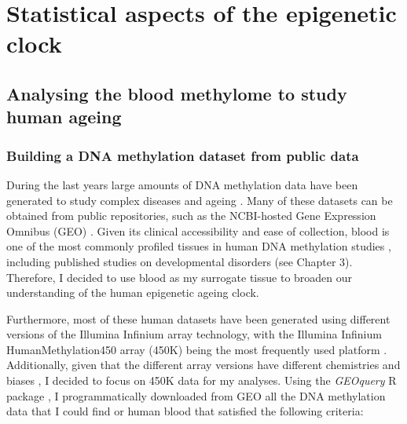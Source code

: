
\chapter{Statistical aspects of the epigenetic clock}  

\ifpdf
\graphicspath{{Chapter2/Figs/pdf/}}
\else
\graphicspath{{Chapter2/Figs/svg/}}
\fi


\section{Analysing the blood methylome to study human ageing}

\smallskip

\subsection{Building a DNA methylation dataset from public data}

\smallskip

During the last years large amounts of DNA methylation data have been generated to study complex diseases and ageing \cite{Rakyan2011,Flanagan2015}. Many of these datasets can be obtained from public repositories, such as the NCBI-hosted Gene Expression Omnibus (\acrshort{GEO}) \cite{Edgar2002}. Given its clinical accessibility and ease of collection, blood is one of the most commonly profiled tissues in human DNA methylation studies \cite{Flanagan2015}, including published studies on developmental disorders \cite{Aref-Eshghi2018} (see Chapter 3). Therefore, I decided to use blood as my surrogate tissue to broaden our understanding of the human epigenetic ageing clock.

\bigskip

Furthermore, most of these human datasets have been generated using different versions of the Illumina Infinium array technology, with the Illumina Infinium HumanMethylation450 array (450K) being the most frequently used platform \cite{Flanagan2015}. Additionally, given that the different array versions have different chemistries and biases \cite{Bibikova2009,Bibikova2011,Pidsley2016}, I decided to focus on 450K data for my analyses. Using the \textit{GEOquery} R package \cite{Davis2007}, I programmatically downloaded from GEO all the DNA methylation data that I could find or human blood that satisfied the following criteria:

